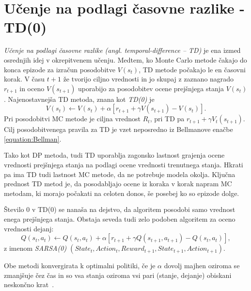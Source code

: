 \documentclass[a4paper, oneside, 12pt]{report}
\begin{document}
\section{Učenje na podlagi časovne razlike - TD(0)} \label{section:TD0}
{\em Učenje na podlagi časovne razlike (angl. temporal-difference -- TD)} je ena izmed osrednjih idej v okrepitvenem učenju. Medtem, ko Monte Carlo metode čakajo do konca epizode za izračun posodobitve $V(s_t)$, TD metode počakajo le en časovni korak. V času $t+1$ že tvorijo ciljno vrednosti in jo skupaj z zaznano nagrado $r_{t+1}$ in oceno $V(s_{t+1})$ uporabijo za posodobitev ocene prejšnjega stanja $V(s_t)$. Najenostavnejša TD metoda, znana kot {\em TD(0)} je
\begin{equation}
V(s_t) \gets V(s_t) + \alpha[r_{t+1} + \gamma V(s_{t+1}) - V(s_t)].
\end{equation}
Pri posodobitvi MC metode je ciljna vrednost $R_t$, pri TD pa $r_{t+1} + \gamma V_t(s_{t+1})$. Cilj posodobitvenega pravila za TD je vzet neposredno iz Bellmanove enačbe \eqref{equation:Bellman}.

Tako kot DP metoda, tudi TD uporablja zagonsko lastnost grajenja ocene vrednosti prejšnjega stanja na podlagi ocene vrednosti trenutnega stanja. Hkrati pa ima TD tudi lastnost MC metode, da ne potrebuje modela okolja. Ključna prednost TD metod je, da posodabljajo ocene iz koraka v korak napram MC metodam, ki morajo počakati na celoten donos, še posebej ko so epizode dolge.


Število 0 v TD(0) se nanaša na dejstvo, da algoritem posodobi samo vrednost enega prejšnjega stanja. Obstaja seveda tudi zelo podoben algoritem za oceno vrednosti dejanj:
\begin{equation}
Q(s_t, a_t) \gets Q(s_t, a_t) + \alpha[r_{t+1} + \gamma Q(s_{t+1}, a_{t+1}) - Q(s_t, a_t)],
\end{equation}
z imenom {\em SARSA(0) $(State_t, Action_t, Reward_{t+1}, State_{t+1}, Action_{t+1})$}.


Obe metodi konvergirata k optimalni politiki, če je $\alpha$ dovolj majhen oziroma se zmanjšuje čez čas in so vsa stanja oziroma vsi pari (stanje, dejanje) obiskani neskončno krat~\cite{LearningWithoutStateEstimationInPartiallyObservableMarkovianDecisionProcesses}.
\end{document}
